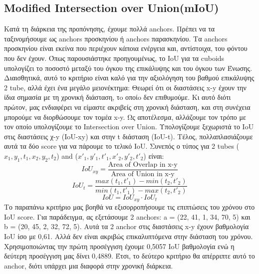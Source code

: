 \documentclass{report}
\begin{document}
\subsection{Modified Intersection over Union(mIoU) } 
Κατά τη διάρκεια της προπόνησης, έχουμε πολλά anchors. Πρέπει να τα ταξινομήσουμε ως anchors προσκηνίου ή
anchors παρασκηνίου. Τα anchors προσκηνίου είναι εκείνα που περιέχουν κάποια ενέργεια και, αντίστοιχα, του φόντου
που δεν έχουν. Όπως παρουσιάστηκε προηγουμένως, το IoU για τα cuboids υπολογίζει το ποσοστό μεταξύ του όγκου της επικάλυψης
και του όγκου των Ένωσης.
Διαισθητικά, αυτό το κριτήριο είναι καλό για την αξιολόγηση του βαθμού επικάλυψης 2 tube, αλλά έχει ένα μεγάλο μειονέκτημα:
Θεωρεί ότι οι διαστάσεις x-y έχουν την ίδια σημασία με τη χρονική διάσταση, τo οποίo δεν επιθυμούμε. Κι αυτό  διότι
πρώτον, μας ενδιαφέρει να είμαστε ακριβείς στη χρονική διάσταση, και στη συνέχεια μπορούμε να διορθώσουμε τον τομέα x-y.
Ως αποτέλεσμα, αλλάζουμε τον τρόπο με τον οποίο υπολογίζουμε το Intersection over Union. Υπολογίζουμε ξεχωριστά
το IoU στις διαστάσεις χ-y (IoU-xy) και στην t διάσταση (IoU-t). Τέλος,  πολλαπλασιάζουμε αυτά τα δύο score για να πάρουμε το τελικό IoU.
Συνεπός ο τύπος για 2 tubes ($x_1, y_1, t_1, x_2, y_2, t_2$) and ($x'_1, y'_1, t'_1, x'_2, y'_2, t'_2$) είναι:
\[ IoU_{xy} = \frac{ \text{Area of Overlap in x-y}} { \text{Area of Union in x-y}}  \]
\[ IoU_t = \frac { max(t_1, t'_1) - min(t_2, t'_2)} {min(t_1,t'_1) - max(t_2,t'_2)} \]
\[ IoU = IoU_{xy} \cdot  IoU_t \]
Το παραπάνω κριτήριο μας βοηθά να εξισορροπήσουμε τις επιπτώσεις του χρόνου στο IoU score. Για παράδειγμα, ας εξετάσουμε 2 anchors:
a = (22, 41, 1, 34, 70, 5) και b = (20, 45, 2, 32, 72, 5). Αυτά τα 2 anchor στις διαστάσεις  x-y έχουν βαθμολογία IoU ίσο με 0,61.
Αλλά δεν είναι ακριβώς επικαλυπτόμενα στην διάσταση του χρόνου. Χρησιμοποιώντας την πρώτη προσέγγιση έχουμε 0,5057 IoU βαθμολογία ενώ η
δεύτερη προσέγγιση μας δίνει 0,4889. Έτσι, το δεύτερο κριτήριο θα απέρριπτε αυτό το anchor, διότι υπάρχει μια διαφορά στην χρονική διάρκεια. \par
\end{document}
